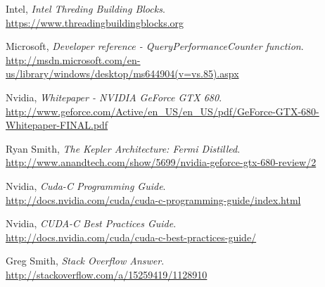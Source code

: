 \documentclass[11pt, oneside, a4paper]{article}
\begin{document}
\begin{thebibliography}{9}

  Intel,
  \emph{Intel Threding Building Blocks}. \\
  \url{https://www.threadingbuildingblocks.org}

  Microsoft,
  \emph{Developer reference - QueryPerformanceCounter function}. \\
  \url{http://msdn.microsoft.com/en-us/library/windows/desktop/ms644904(v=vs.85).aspx}

	Nvidia,
	\emph{Whitepaper - NVIDIA GeForce GTX 680}. \\
	\url{http://www.geforce.com/Active/en_US/en_US/pdf/GeForce-GTX-680-Whitepaper-FINAL.pdf}

	Ryan Smith,
	\emph{The Kepler Architecture: Fermi Distilled}. \\
	\url{http://www.anandtech.com/show/5699/nvidia-geforce-gtx-680-review/2}

	Nvidia,
	\emph{Cuda-C Programming Guide}. \\
	\url{http://docs.nvidia.com/cuda/cuda-c-programming-guide/index.html}

	Nvidia,
	\emph{CUDA-C Best Practices Guide}. \\
	\url{http://docs.nvidia.com/cuda/cuda-c-best-practices-guide/}

	Greg Smith,
	\emph{Stack Overflow Answer}. \\
	\url{http://stackoverflow.com/a/15259419/1128910}

\end{thebibliography}
\end{document}

